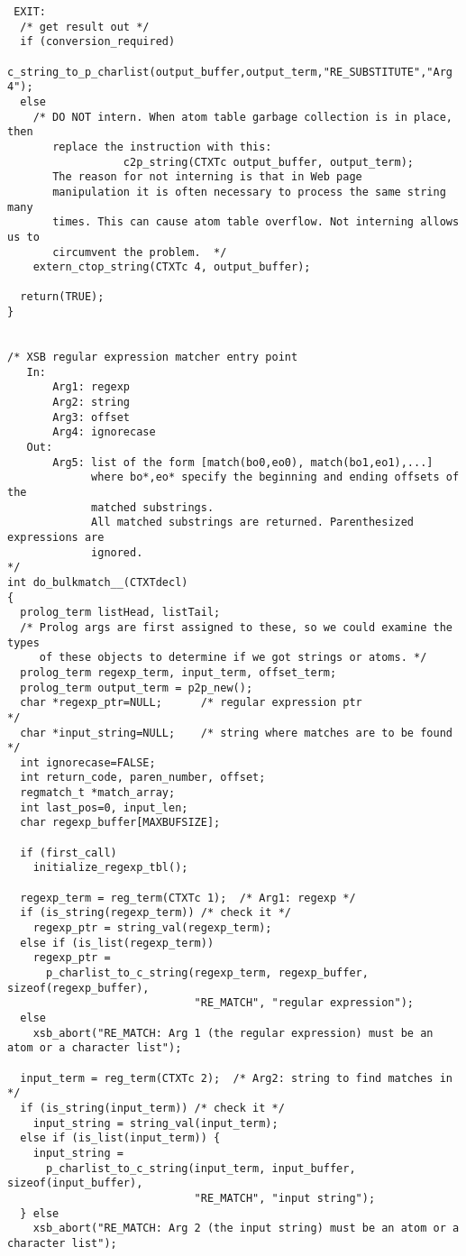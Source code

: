 {\begin{verbatim}
 EXIT:
  /* get result out */
  if (conversion_required)
    c_string_to_p_charlist(output_buffer,output_term,"RE_SUBSTITUTE","Arg 4");
  else
    /* DO NOT intern. When atom table garbage collection is in place, then
       replace the instruction with this:
                  c2p_string(CTXTc output_buffer, output_term);
       The reason for not interning is that in Web page
       manipulation it is often necessary to process the same string many
       times. This can cause atom table overflow. Not interning allows us to
       circumvent the problem.  */
    extern_ctop_string(CTXTc 4, output_buffer);
  
  return(TRUE);
}


/* XSB regular expression matcher entry point
   In:
       Arg1: regexp
       Arg2: string
       Arg3: offset
       Arg4: ignorecase
   Out:
       Arg5: list of the form [match(bo0,eo0), match(bo1,eo1),...]
             where bo*,eo* specify the beginning and ending offsets of the
             matched substrings.
             All matched substrings are returned. Parenthesized expressions are
             ignored.
*/
int do_bulkmatch__(CTXTdecl)
{
  prolog_term listHead, listTail;
  /* Prolog args are first assigned to these, so we could examine the types
     of these objects to determine if we got strings or atoms. */
  prolog_term regexp_term, input_term, offset_term;
  prolog_term output_term = p2p_new();
  char *regexp_ptr=NULL;      /* regular expression ptr               */
  char *input_string=NULL;    /* string where matches are to be found */
  int ignorecase=FALSE;
  int return_code, paren_number, offset;
  regmatch_t *match_array;
  int last_pos=0, input_len;
  char regexp_buffer[MAXBUFSIZE];

  if (first_call)
    initialize_regexp_tbl();

  regexp_term = reg_term(CTXTc 1);  /* Arg1: regexp */
  if (is_string(regexp_term)) /* check it */
    regexp_ptr = string_val(regexp_term);
  else if (is_list(regexp_term))
    regexp_ptr =
      p_charlist_to_c_string(regexp_term, regexp_buffer, sizeof(regexp_buffer),
                             "RE_MATCH", "regular expression");
  else
    xsb_abort("RE_MATCH: Arg 1 (the regular expression) must be an atom or a character list");

  input_term = reg_term(CTXTc 2);  /* Arg2: string to find matches in */
  if (is_string(input_term)) /* check it */
    input_string = string_val(input_term);
  else if (is_list(input_term)) {
    input_string =
      p_charlist_to_c_string(input_term, input_buffer, sizeof(input_buffer),
                             "RE_MATCH", "input string");
  } else
    xsb_abort("RE_MATCH: Arg 2 (the input string) must be an atom or a character list");


\end{verbatim}}

